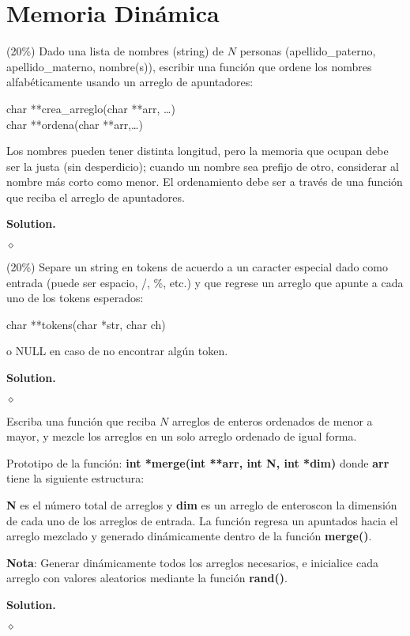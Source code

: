 \documentclass{article}
\theoremstyle{problemstyle}
\newenvironment{solution}{%
  \begin{mdframed}[linewidth=0.8pt,linecolor=Gray,backgroundcolor=Gray!5,roundcorner=5pt, nobreak=true]%
  \noindent\textbf{Solution.}%
}{%
\hfill $ \diamond $ 
  \end{mdframed}%
}
\begin{document}
\section*{Memoria Din\'amica}\label{sec:memoria_din_amica} %
\begin{problem}
(20\%) Dado una lista de nombres (string) de $ N $ personas (apellido\_paterno, apellido\_materno, nombre(s)), escribir una funci\'on que ordene los nombres alfab\'eticamente usando un arreglo de apuntadores:
\begin{center}
  char **crea\_arreglo(char **arr, \dots)\\
  char **ordena(char **arr,\dots)
\end{center}
Los nombres pueden tener distinta longitud, pero la memoria que ocupan debe ser la justa (sin desperdicio); cuando un nombre sea prefijo de otro, considerar al nombre m\'as corto como menor. El ordenamiento debe ser a trav\'es de una funci\'on que reciba el arreglo de apuntadores.
\end{problem}
\begin{solution}
  
\end{solution}

\begin{problem}
  (20\%) Separe un string en tokens de acuerdo a un caracter especial dado como entrada (puede ser espacio, /, \%, etc.) y que regrese un arreglo que apunte a cada uno de los tokens esperados:
\begin{center}
  char **tokens(char *str, char ch)
\end{center}
 o NULL en caso de no encontrar alg\'un token.
  
\end{problem}

\begin{solution}
  
\end{solution}

\begin{problem}
 Escriba una funci\'on que reciba $ N $ arreglos de enteros ordenados de menor a mayor, y mezcle los arreglos en un solo arreglo ordenado de igual forma. 

Prototipo de la funci\'on:
\textbf{int *merge(int **arr, int N, int *dim)}
donde \textbf{arr} tiene la siguiente estructura:

\textbf{N} es el n\'umero total de arreglos y \textbf{dim} es un arreglo de enteroscon la dimensi\'on de cada uno de los arreglos de entrada. La funci\'on regresa un apuntados hacia el arreglo mezclado y generado din\'amicamente dentro de la funci\'on \textbf{merge()}.

\textbf{Nota}: Generar din\'amicamente todos los arreglos necesarios, e inicialice cada arreglo con valores aleatorios mediante la funci\'on \textbf{rand()}.
\end{problem}
\begin{solution}
  
\end{solution}



\end{document}

